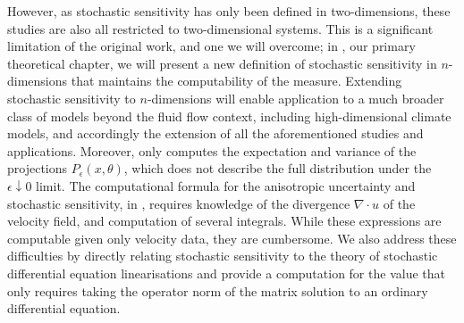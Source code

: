 However, as stochastic sensitivity has only been defined in two-dimensions, these studies are also all restricted to two-dimensional systems.
This is a significant limitation of the original work, and one we will overcome; in , our primary theoretical chapter, we will present a new definition of stochastic sensitivity in \(n\)-dimensions that maintains the computability of the measure.
Extending stochastic sensitivity to \(n\)-dimensions will enable application to a much broader class of models beyond the fluid flow context, including high-dimensional climate models, and accordingly the extension of all the aforementioned studies and applications.
Moreover, \citet{Balasuriya_2020_StochasticSensitivityComputable} only computes the expectation and variance of the projections \(P_\epsilon(x,\theta)\), which does not describe the full  distribution under the \(\epsilon\downarrow 0\) limit.
The computational formula for the anisotropic uncertainty and stochastic sensitivity, in , requires knowledge of the divergence \(\nabla\cdot u\) of the velocity field, and computation of several integrals.
While these expressions are computable given only velocity data, they are cumbersome.
We also address these difficulties by directly relating stochastic sensitivity to the theory of stochastic differential equation linearisations and provide a computation for the value that only requires taking the operator norm of the matrix solution to an ordinary differential equation.
